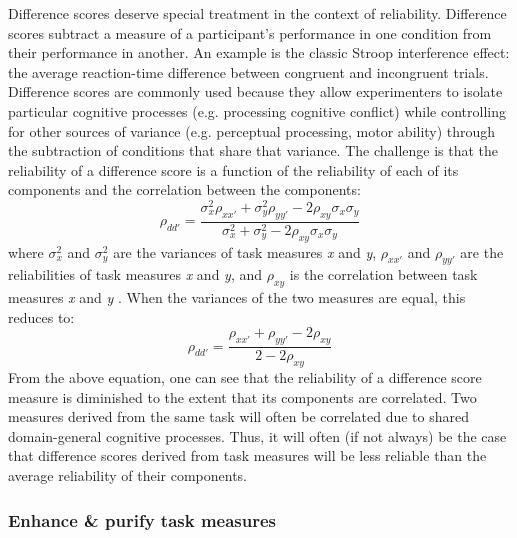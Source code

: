 \documentclass[a4paper,notitlepage,12pt]{article}
\begin{document}
Difference scores deserve special treatment in the context of reliability. Difference scores subtract a measure of a participant's performance in one condition from their performance in another. An example is the classic Stroop interference effect: the average reaction-time difference between congruent and incongruent trials. Difference scores are commonly used because they allow experimenters to isolate particular cognitive processes (e.g. processing cognitive conflict) while controlling for other sources of variance (e.g. perceptual processing, motor ability) through the subtraction of conditions that share that variance. The challenge is that the reliability of a difference score is a function of the reliability of each of its components and the correlation between the components:
\begin{equation}
    \rho_{dd'} = \frac{\sigma^2_x \rho_{xx'} + \sigma^2_y \rho_{yy'} - 2 \rho_{xy} \sigma_x \sigma_y}{\sigma^2_x + \sigma^2_y - 2 \rho_{xy} \sigma_x \sigma_y}
\end{equation}
where $\sigma^2_x$ and $\sigma^2_y$ are the variances of task measures \textit{x} and \textit{y}, $\rho_{xx'}$ and $\rho_{yy'}$ are the reliabilities of task measures \textit{x} and \textit{y}, and $\rho_{xy}$ is the correlation between task measures \textit{x} and \textit{y} \cite{chiou1996reliability}. When the variances of the two measures are equal, this reduces to: 
\begin{equation}
    \rho_{dd'} = \frac{\rho_{xx'} + \rho_{yy'} - 2 \rho_{xy}}{2 - 2 \rho_{xy}}
\end{equation}
From the above equation, one can see that the reliability of a difference score measure is diminished to the extent that its components are correlated. Two measures derived from the same task will often be correlated due to shared domain-general cognitive processes. Thus, it will often (if not always) be the case that difference scores derived from task measures will be less reliable than the average reliability of their components. 

\subsubsection{Enhance \& purify task measures}
\end{document}
